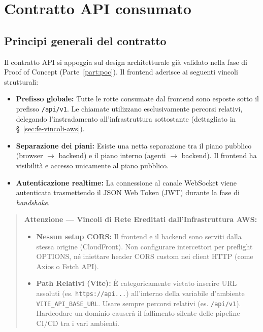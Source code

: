\documentclass[11pt,a4paper]{article}
\begin{document}
\section{Contratto API consumato}
\label{sec:fe-contratto-api}

\subsection{Principi generali del contratto}

Il contratto API si appoggia sul design architetturale già validato nella fase di Proof of Concept (Parte~\ref{part:poc}). Il frontend aderisce ai seguenti vincoli strutturali:

\begin{itemize}
    \item \textbf{Prefisso globale:} Tutte le rotte consumate dal frontend sono esposte sotto il prefisso \texttt{/api/v1}. Le chiamate utilizzano esclusivamente percorsi relativi, delegando l'instradamento all'infrastruttura sottostante (dettagliato in \S~\ref{sec:fe-vincoli-aws}).
    \item \textbf{Separazione dei piani:} Esiste una netta separazione tra il piano pubblico (browser $\to$ backend) e il piano interno (agenti $\to$ backend). Il frontend ha visibilità e accesso unicamente al piano pubblico.
    \item \textbf{Autenticazione realtime:} La connessione al canale WebSocket viene autenticata trasmettendo il JSON Web Token (JWT) durante la fase di \emph{handshake}.
\end{itemize}

\begin{quote}
\textbf{Attenzione --- Vincoli di Rete Ereditati dall'Infrastruttura AWS:}
\begin{itemize}
    \item \textbf{Nessun setup CORS:} Il frontend e il backend sono serviti dalla stessa origine (CloudFront). Non configurare intercettori per preflight OPTIONS, né iniettare header CORS custom nei client HTTP (come Axios o Fetch API).
    \item \textbf{Path Relativi (Vite):} È categoricamente vietato inserire URL assoluti (es. \texttt{https://api...}) all'interno della variabile d'ambiente \texttt{VITE\_API\_BASE\_URL}. Usare sempre percorsi relativi (es. \texttt{/api/v1}). Hardcodare un dominio causerà il fallimento silente delle pipeline CI/CD tra i vari ambienti.
\end{itemize}
\end{quote}
\end{document}
